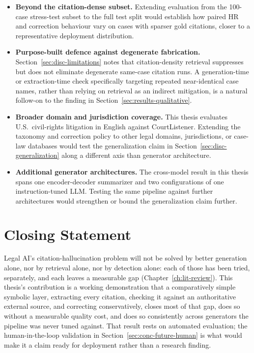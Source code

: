 \begin{itemize}
  \item \textbf{Beyond the citation-dense subset.} Extending evaluation from the 100-case stress-test subset to the full test split would establish how paired HR and correction behaviour vary on cases with sparser gold citations, closer to a representative deployment distribution.
  \item \textbf{Purpose-built defence against degenerate fabrication.} Section~\ref{sec:disc-limitations} notes that citation-density retrieval suppresses but does not eliminate degenerate same-case citation runs. A generation-time or extraction-time check specifically targeting repeated near-identical case names, rather than relying on retrieval as an indirect mitigation, is a natural follow-on to the finding in Section~\ref{sec:results-qualitative}.
  \item \textbf{Broader domain and jurisdiction coverage.} This thesis evaluates U.S.\ civil-rights litigation in English against CourtListener. Extending the taxonomy and correction policy to other legal domains, jurisdictions, or case-law databases would test the generalization claim in Section~\ref{sec:disc-generalization} along a different axis than generator architecture.
  \item \textbf{Additional generator architectures.} The cross-model result in this thesis spans one encoder-decoder summarizer and two configurations of one instruction-tuned LLM. Testing the same pipeline against further architectures would strengthen or bound the generalization claim further.
\end{itemize}

\section{Closing Statement}
\label{sec:conc-closing}

Legal AI's citation-hallucination problem will not be solved by better generation alone, nor by retrieval alone, nor by detection alone: each of those has been tried, separately, and each leaves a measurable gap (Chapter~\ref{ch:lit-review}). This thesis's contribution is a working demonstration that a comparatively simple symbolic layer, extracting every citation, checking it against an authoritative external source, and correcting conservatively, closes most of that gap, does so without a measurable quality cost, and does so consistently across generators the pipeline was never tuned against. That result rests on automated evaluation; the human-in-the-loop validation in Section~\ref{sec:conc-future-human} is what would make it a claim ready for deployment rather than a research finding.
